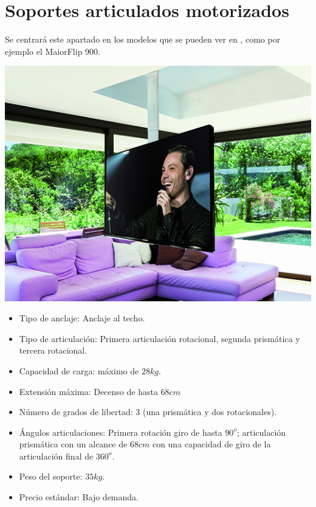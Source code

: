 \section{Soportes articulados motorizados}

Se centrará este apartado en los modelos que se pueden ver en \cite{maiormover:2018}, como por ejemplo el MaiorFlip 900.

\begin{minipage}{0.35\textwidth}
   \includegraphics[width=\linewidth]{figuras/Imagenes_EstadoArte/not_valid_1.jpg}
\end{minipage}
\begin{minipage}{0.65\textwidth}\raggedright
   \hspace{1cm}
   \begin{itemize}
       \item Tipo de anclaje: Anclaje al techo.
       \item Tipo de articulación: Primera articulación rotacional, segunda prismática y tercera rotacional.
       \item Capacidad de carga: máximo de $28kg$.
       \item Extensión máxima: Decenso de hasta $68cm$
       \item Número de grados de libertad: 3 (una prismática y dos rotacionales).
       \item Ángulos articulaciones: Primera rotación giro de hasta $90^o$; articulación prismática con un alcance de $68cm$ con una capacidad de giro de la articulación final de $360^o$.
       \item Peso del soporte: $35kg$.
       \item Precio estándar: Bajo demanda.
   \end{itemize}
\end{minipage}
\\

